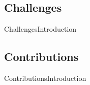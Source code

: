 \subsection*{Challenges}
\begin{frame}[bg]{Challenges}{Introduction}
\end{frame}


\subsection*{Contributions}
\begin{frame}{Contributions}{Introduction}
\end{frame}

